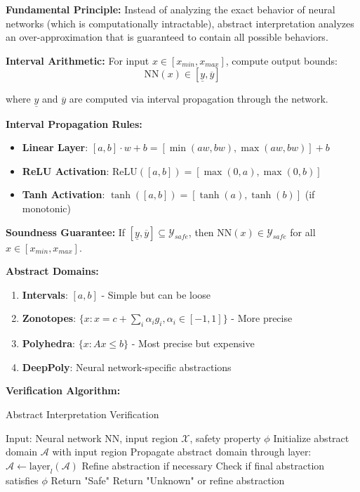 \documentclass[12pt]{article}
\begin{document}
{{{{\textbf{Fundamental Principle:}
Instead of analyzing the exact behavior of neural networks (which is computationally intractable), abstract interpretation analyzes an over-approximation that is guaranteed to contain all possible behaviors.

\textbf{Interval Arithmetic:}
For input $x \in [x_{min}, x_{max}]$, compute output bounds:
\begin{equation}
\text{NN}(x) \in [\underline{y}, \overline{y}]
\end{equation}

where $\underline{y}$ and $\overline{y}$ are computed via interval propagation through the network.

\textbf{Interval Propagation Rules:}
\begin{itemize}
\item \textbf{Linear Layer}: $[a,b] \cdot w + b = [\min(aw, bw), \max(aw, bw)] + b$
\item \textbf{ReLU Activation}: $\text{ReLU}([a,b]) = [\max(0,a), \max(0,b)]$
\item \textbf{Tanh Activation}: $\tanh([a,b]) = [\tanh(a), \tanh(b)]$ (if monotonic)
\end{itemize}

\textbf{Soundness Guarantee:}
If $[\underline{y}, \overline{y}] \subseteq \mathcal{Y}_{safe}$, then $\text{NN}(x) \in \mathcal{Y}_{safe}$ for all $x \in [x_{min}, x_{max}]$.

\textbf{Abstract Domains:}
\begin{enumerate}
\item \textbf{Intervals}: $[a,b]$ - Simple but can be loose
\item \textbf{Zonotopes}: $\{x : x = c + \sum_i \alpha_i g_i, \alpha_i \in [-1,1]\}$ - More precise
\item \textbf{Polyhedra}: $\{x : Ax \leq b\}$ - Most precise but expensive
\item \textbf{DeepPoly}: Neural network-specific abstractions
\end{enumerate}

\textbf{Verification Algorithm:}
\begin{algorithm}[H]
\caption{Abstract Interpretation Verification}
\begin{algorithmic}[1]
\STATE Input: Neural network $\text{NN}$, input region $\mathcal{X}$, safety property $\phi$
\STATE Initialize abstract domain $\mathcal{A}$ with input region
    \STATE Propagate abstract domain through layer: $\mathcal{A} \leftarrow \text{layer}_l(\mathcal{A})$
    \STATE Refine abstraction if necessary
\ENDFOR
\STATE Check if final abstraction satisfies $\phi$
    \STATE Return "Safe"
\ELSE
    \STATE Return "Unknown" or refine abstraction
\ENDIF
\end{algorithmic}
\end{algorithm}

}}}}
\end{document}
